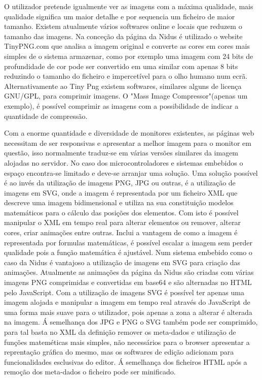 O utilizador pretende igualmente ver as imagens com a máxima qualidade, mais qualidade significa um maior detalhe e por sequencia um ficheiro de maior tamanho. Existem atualmente vários softwares online e locais que reduzem o tamanho das imagens. Na conceção da página da Nidus é utilizado o website TinyPNG.com que analisa a imagem original e converte as cores em cores mais simples de o sistema armazenar, como por exemplo uma imagem com 24 bits de profundidade de cor pode ser convertido em uma similar com apenas 8 bits reduzindo o tamanho do ficheiro e impercetível para o olho humano num ecrã\cite{Hilles2019}. Alternativamente ao Tiny Png existem softwares, similares alguns de licença GNU/GPL, para comprimir imagens. O "Mass Image Compressor"\cite{Mass_Image_Compressor}(apenas um exemplo), é possível comprimir as imagens com a possibilidade de indicar a quantidade de compressão.
\par
Com a enorme quantidade e diversidade de monitores existentes, as páginas web necessitam de ser responsivas e apresentar a melhor imagem para o monitor em questão, isso normalmente traduz-se em várias versões similares da imagem alojadas no servidor. No caso dos microcontroladores e sistemas embebidos o espaço encontra-se limitado e deve-se arranjar uma solução. Uma solução possível é ao invés da utilização de imagens PNG, JPG ou outras, é a utilização de imagens em SVG, onde a imagem é representada por um ficheiro XML que descreve uma imagem bidimensional e utiliza na sua constituição modelos matemáticos para o cálculo das posições dos elementos. Com isto é possível manipular o XML em tempo real para alterar elementos ou remover, alterar cores, criar animações entre outras. Inclui a vantagem de como a imagem é representada por formulas matemáticas, é possível escalar a imagem sem perder qualidade pois a função matemática é ajustável. Num sistema embebido como o caso da Nidus é vantajoso a utilização de imagens em SVG para criação das animações. Atualmente as animações da página da Nidus são criadas com várias imagens PNG comprimidas e convertidas em base64 e são alternadas no HTML pelo JavaScript. Com a utilização de imagens SVG é possível ter apenas uma imagem alojada e manipular a imagem em tempo real através do JavaScript de uma forma mais suave para o utilizador, pois apenas a zona a alterar é alterada na imagem.
Á semelhança dos JPG e PNG o SVG também pode ser comprimido, para tal basta no XML da definição remover os meta-dados  e utilização de funções mateméticas mais simples, não necessários para o browser apresentar a reprentação gráfica do mesmo, mas os softwares de edição adicionam para funcionalidades esclusivas do editor. Á semelhança dos ficheiros HTML após a remoção dos meta-dados o ficheiro pode ser minificado.


